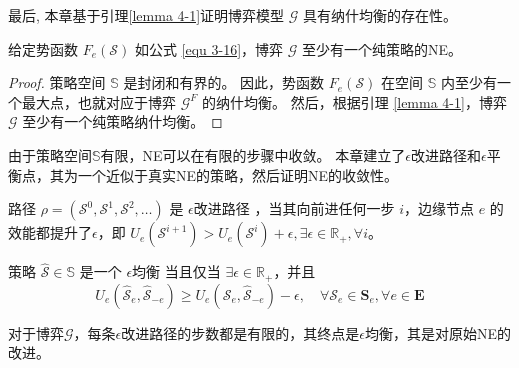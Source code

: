 最后, 本章基于引理\ref{lemma 4-1}证明博弈模型 $\mathcal{G}$ 具有纳什均衡的存在性。
\begin{theorem}
	给定势函数 $F_{e}(\mathcal{S})$ 如公式 \ref{equ 3-16}，博弈 $\mathcal{G}$ 至少有一个纯策略的NE。
\label{theorem 4-2}
\end{theorem}
\begin{proof}
策略空间 $\mathbb{S}$ 是封闭和有界的。 
因此，势函数 $F_{e}(\mathcal{S})$ 在空间 $\mathbb{S}$ 内至少有一个最大点，也就对应于博弈 $\mathcal{G}^{F}$ 的纳什均衡。 
然后，根据引理 \ref{lemma 4-1}，博弈 $\mathcal{G}$ 至少有一个纯策略纳什均衡。
\end{proof}
\noindent 由于策略空间$\mathbb{S}$有限，NE可以在有限的步骤中收敛。
本章建立了$\epsilon$改进路径和$\epsilon$平衡点\cite{chew2016potential}，其为一个近似于真实NE的策略，然后证明NE的收敛性。
\begin{definition} 
	路径 $\rho=\left(\mathcal{S}^{0}, \mathcal{S}^{1}, \mathcal{S}^{2}, \ldots\right)$ 是 $\epsilon$改进路径 \cite{chew2016potential}，当其向前进任何一步 $i$，边缘节点 $e$ 的效能都提升了$\epsilon$，即 $U_{e}\left(\mathcal{S}^{i+1}\right) > U_{e}\left(\mathcal{S}^{i}\right) + \epsilon, \exists \epsilon \in \mathbb{R}_{+}, \forall i$。
\end{definition}
\begin{definition}
	策略 $\mathcal{\hat{S}} \in \mathbb{S}$ 是一个 $\epsilon$均衡 \cite{chew2016potential} 当且仅当 $\exists \epsilon \in \mathbb{R}_{+}$，并且
	\begin{equation}
		U_{e}\left(\mathcal{\hat{S}}_{e}, \mathcal{\hat{S}}_{-e}\right) \geq U_{e}\left(\mathcal{S}_{e}, \mathcal{\hat{S}}_{-e}\right) - \epsilon, \quad \forall \mathcal{S}_{e} \in \mathbf{S}_{e}, \forall e \in \mathbf{E}
	\end{equation}
\end{definition}
\begin{theorem}
对于博弈$\mathcal{G}$，每条$\epsilon$改进路径的步数都是有限的，其终点是$\epsilon$均衡，其是对原始NE的改进。
\label{theorem 4-3}
\end{theorem}
